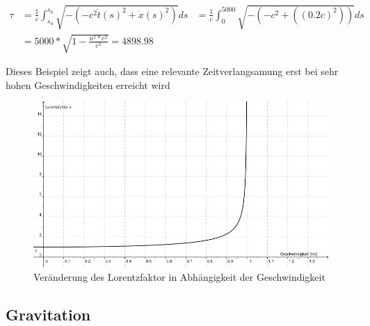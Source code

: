 \begin{refsection}
\begin{align*}
    \tau
    &=
    \frac{1}{c}\int_{s_{a}}^{s_{b}}\sqrt{-(-c^2\dot{t}(s)^2+\dot{x}(s)^2)}ds
    &=
    \frac{1}{c}\int_{0}^{5000}\sqrt{-(-c^2+((0.2c)^2))}ds\\
    &=
    5000*\sqrt{1-\frac{u^2*c^2}{c^2}} = 4898.98
\end{align*}

Dieses Beispiel zeigt auch, dass eine relevante Zeitverlangsamung erst bei sehr hohen Geschwindigkeiten erreicht wird

\begin{figure}
    \centering
    \includegraphics[width=\hsize]{zeitreisen/Lorentzfaktor.jpg}
    \caption{Ver\"anderung des Lorentzfaktor in Abh\"angigkeit der Geschwindigkeit%
        \label{skript:geodaten:fig:transport}}
\end{figure}

\subsection{Gravitation}


\end{refsection}

